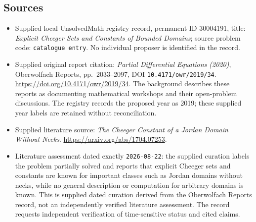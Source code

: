 \documentclass[11pt]{article}
\begin{document}
\subsection{Sources}
\begin{itemize}
\item Supplied local UnsolvedMath registry record, permanent ID \(30004191\), title: \emph{Explicit Cheeger Sets and Constants of Bounded Domains}; source problem code: \texttt{catalogue entry}. No individual proposer is identified in the record.
\item Supplied original report citation: \emph{Partial Differential Equations (2020)}, Oberwolfach Reports, pp.\ 2033--2097, DOI \texttt{10.4171/owr/2019/34}. \url{https://doi.org/10.4171/owr/2019/34}. The background describes these reports as documenting mathematical workshops and their open-problem discussions. The registry records the proposed year as 2019; these supplied year labels are retained without reconciliation.
\item Supplied literature source: \emph{The Cheeger Constant of a Jordan Domain Without Necks}. \url{https://arxiv.org/abs/1704.07253}.
\item Literature assessment dated exactly \texttt{2026-08-22}: the supplied curation labels the problem partially solved and reports that explicit Cheeger sets and constants are known for important classes such as Jordan domains without necks, while no general description or computation for arbitrary domains is known. This is supplied dated curation derived from the Oberwolfach Reports record, not an independently verified literature assessment. The record requests independent verification of time-sensitive status and cited claims.
\end{itemize}
\end{document}
